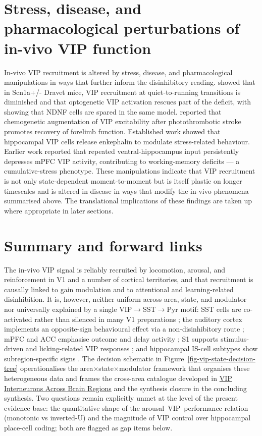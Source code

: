 \documentclass[11pt]{article}
\let\origrightarrow\rightarrow
\def\rightarrow{\ensuremath{\origrightarrow}}
\begin{document}
\section{Stress, disease, and pharmacological perturbations of in-vivo VIP function}

In-vivo VIP recruitment is altered by stress, disease, and pharmacological manipulations in ways that further inform the disinhibitory reading. \citet{Goff2023} showed that in Scn1a+/- Dravet mice, VIP recruitment at quiet-to-running transitions is diminished and that optogenetic VIP activation rescues part of the deficit, with \citet{Liebergall2024} showing that NDNF cells are spared in the same model. \citet{Motaharinia2021} reported that chemogenetic augmentation of VIP excitability after photothrombotic stroke promotes recovery of forelimb function. Established work \citep{Leroy2022} showed that hippocampal VIP cells release enkephalin to modulate stress-related behaviour. Earlier work \citep{Silverstein2025} reported that repeated ventral-hippocampus input persistently depresses mPFC VIP activity, contributing to working-memory deficits --- a cumulative-stress phenotype. These manipulations indicate that VIP recruitment is not only state-dependent moment-to-moment but is itself plastic on longer timescales and is altered in disease in ways that modify the in-vivo phenomena summarised above. The translational implications of these findings are taken up where appropriate in later sections.

\section{Summary and forward links}

The in-vivo VIP signal is reliably recruited by locomotion, arousal, and reinforcement in V1 and a number of cortical territories, and that recruitment is causally linked to gain modulation and to attentional and learning-related disinhibition. It is, however, neither uniform across area, state, and modulator nor universally explained by a single VIP\rightarrow SST\rightarrow Pyr motif: SST cells are co-activated rather than silenced in many V1 preparations \citep{Pakan2016, Dipoppa2018}; the auditory cortex implements an opposite-sign behavioural effect via a non-disinhibitory route \citep{Bigelow2019, Yavorska2021}; mPFC and ACC emphasise outcome and delay activity \citep{Pinto2015, Kamigaki2017}; S1 supports stimulus-driven and licking-related VIP responses \citep{Yu2019, Ramamurthy2023, Sachidhanandam2016}; and hippocampal IS-cell subtypes show subregion-specific signs \citep{Francavilla2018a, Luo2020, Lenkey2025}. The decision schematic in Figure~\ref{fig-vip-state-decision-tree} operationalises the area$\times$state$\times$modulator framework that organises these heterogeneous data and frames the cross-area catalogue developed in \href{/cross-areas}{VIP Interneurons Across Brain Regions} and the synthesis closure in the concluding synthesis. Two questions remain explicitly unmet at the level of the present evidence base: the quantitative shape of the arousal--VIP--performance relation (monotonic vs inverted-U) and the magnitude of VIP control over hippocampal place-cell coding; both are flagged as gap items below.
\end{document}
